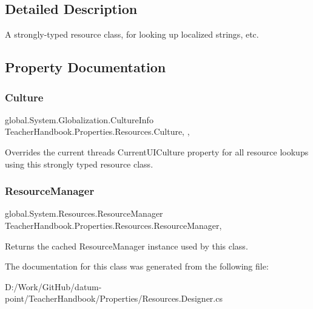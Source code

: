 \subsection{Detailed Description}
A strongly-\/typed resource class, for looking up localized strings, etc. 



\subsection{Property Documentation}
\mbox{\label{class_teacher_handbook_1_1_properties_1_1_resources_a7d2a69e42deca52f95de104f0283705c}} 
\subsubsection{\texorpdfstring{Culture}{Culture}}
{\footnotesize\ttfamily global.\+System.\+Globalization.\+Culture\+Info Teacher\+Handbook.\+Properties.\+Resources.\+Culture\hspace{0.3cm}{\ttfamily [static]}, {\ttfamily [get]}, {\ttfamily [set]}}



Overrides the current thread\textquotesingle{}s Current\+U\+I\+Culture property for all resource lookups using this strongly typed resource class. 

\mbox{\label{class_teacher_handbook_1_1_properties_1_1_resources_a21ca51d6f85c0dfdff618767488d942f}} 
\subsubsection{\texorpdfstring{Resource\+Manager}{ResourceManager}}
{\footnotesize\ttfamily global.\+System.\+Resources.\+Resource\+Manager Teacher\+Handbook.\+Properties.\+Resources.\+Resource\+Manager\hspace{0.3cm}{\ttfamily [static]}, {\ttfamily [get]}}



Returns the cached Resource\+Manager instance used by this class. 



The documentation for this class was generated from the following file\+:\begin{DoxyCompactItemize}
\item 
D\+:/\+Work/\+Git\+Hub/datum-\/point/\+Teacher\+Handbook/\+Properties/Resources.\+Designer.\+cs\end{DoxyCompactItemize}
